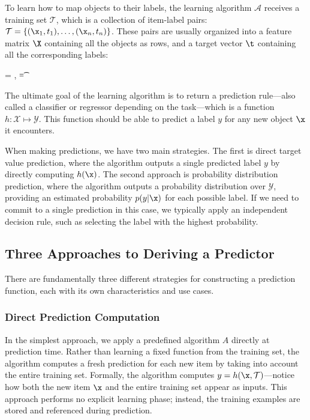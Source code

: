To learn how to map objects to their labels, the learning algorithm $\mathcal{A}$ receives a \alert{training set} $\mathcal{T}$, which is a collection of item-label pairs: $\mathcal{T} = \{(\x_1, t_1), \ldots, (\x_n, t_n)\}$. These pairs are usually organized into a \alert{feature matrix} $\X$ containing all the objects as rows, and a \alert{target vector} $\t$ containing all the corresponding labels:
\begin{myequation}
\X = , \quad \t = 
\end{myequation}

The ultimate goal of the learning algorithm is to return a \alert{prediction rule}---also called a \alert{classifier} or \alert{regressor} depending on the task---which is a function $h: \mathcal{X} \mapsto \mathcal{Y}$. This function should be able to predict a label $y$ for any new object $\x$ it encounters.

When making predictions, we have two main strategies. The first is \alert{direct target value prediction}, where the algorithm outputs a single predicted label $y$ by directly computing $h(\x)$. The second approach is \alert{probability distribution prediction}, where the algorithm outputs a probability distribution over $\mathcal{Y}$, providing an estimated probability $p(y|\x)$ for each possible label. If we need to commit to a single prediction in this case, we typically apply an independent decision rule, such as selecting the label with the highest probability.

\subsection*{Three Approaches to Deriving a Predictor}

There are fundamentally three different strategies for constructing a prediction function, each with its own characteristics and use cases.

\subsubsection*{Direct Prediction Computation}

In the simplest approach, we apply a predefined algorithm $A$ directly at prediction time. Rather than learning a fixed function from the training set, the algorithm computes a fresh prediction for each new item by taking into account the entire training set. Formally, the algorithm computes $y = h(\x, \mathcal{T})$---notice how both the new item $\x$ and the entire training set appear as inputs. This approach performs no explicit learning phase; instead, the training examples are stored and referenced during prediction.

